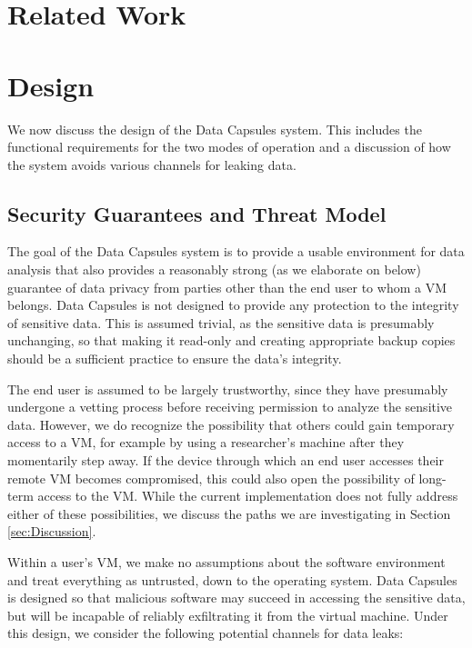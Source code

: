 \documentclass{acm_proc_article-sp}
\begin{document}
\section{Related Work}


\section{Design}

We now discuss the design of the Data Capsules system.  This includes the
functional requirements for the two modes of operation and a discussion of how
the system avoids various channels for leaking data.

\subsection{Security Guarantees and Threat Model}

The goal of the Data Capsules system is to provide a usable environment for data
analysis that also provides a reasonably strong (as we elaborate on below)
guarantee of data privacy from parties other than the end user to whom a VM
belongs.  Data Capsules is not designed to provide any protection to the
integrity of sensitive data.  This is assumed trivial, as the sensitive data is
presumably unchanging, so that making it read-only and creating appropriate
backup copies should be a sufficient practice to ensure the data's integrity.

The end user is assumed to be largely trustworthy, since they have presumably
undergone a vetting process before receiving permission to analyze the sensitive
data.  However, we do recognize the possibility that others could gain temporary
access to a VM, for example by using a researcher's machine after they
momentarily step away.  If the device through which an end user accesses their
remote VM becomes compromised, this could also open the possibility of long-term
access to the VM.  While the current implementation does not fully address
either of these possibilities, we discuss the paths we are investigating in
Section \ref{sec:Discussion}. 

Within a user's VM, we make no assumptions about the software environment and
treat everything as untrusted, down to the operating system.  Data Capsules is
designed so that malicious software may succeed in accessing the sensitive data,
but will be incapable of reliably exfiltrating it from the virtual machine.
Under this design, we consider the following potential channels for data leaks:
\end{document}
